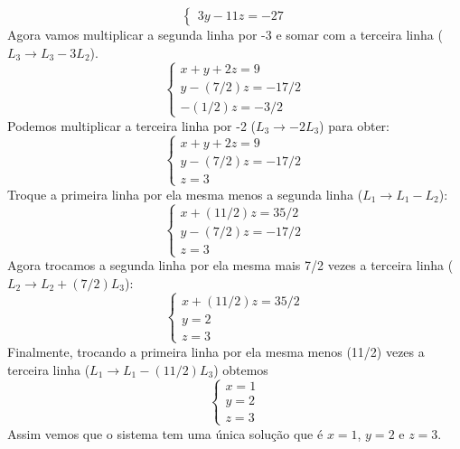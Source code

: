 \begin{exemplos}
\begin{solucao}
\begin{enumerate}[label={\arabic*})]
\[\begin{cases}
                                3y - 11z = -27
                            \end{cases}
                        \]
                        Agora vamos multiplicar a segunda linha por -3 e somar com a terceira linha ($L_3 \to L_3 - 3L_2$).
                        \[
                            \begin{cases}
                                x + y + 2z = 9\\
                                y - (7/2)z = -17/2\\
                                - (1/2)z = -3/2
                            \end{cases}
                        \]
                        Podemos multiplicar a terceira linha por -2 ($L_3 \to -2L_3$) para obter:
                        \[
                            \begin{cases}
                                x + y + 2z = 9\\
                                y - (7/2)z = -17/2\\
                                z = 3
                            \end{cases}
                        \]
                        Troque a primeira linha por ela mesma menos a segunda linha ($L_1 \to L_1 - L_2$):
                        \[
                            \begin{cases}
                                x + (11/2)z = 35/2\\
                                y - (7/2)z = -17/2\\
                                z = 3
                            \end{cases}
                        \]
                        Agora trocamos a segunda linha por ela mesma mais 7/2 vezes a terceira linha ($L_2 \to L_2 + (7/2)L_3$):
                        \[
                            \begin{cases}
                                x + (11/2)z = 35/2\\
                                y  = 2\\
                                z = 3
                            \end{cases}
                        \]
                        Finalmente, trocando a primeira linha por ela mesma menos (11/2) vezes a terceira linha ($L_1 \to L_1 - (11/2)L_3$) obtemos
                        \[
                            \begin{cases}
                                x = 1\\
                                y = 2\\
                                z = 3
                            \end{cases}
                        \]
                        Assim vemos que o sistema tem uma única solução que é $x = 1$, $y = 2$ e $z = 3$.
		\end{enumerate}
	\end{solucao}
\end{exemplos}

